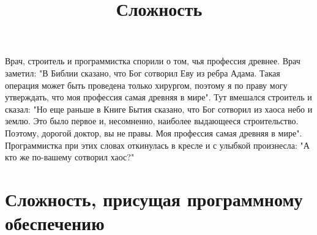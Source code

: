 \documentclass[11pt]{article}
\author{}
\date{}
\begin{document}
\title{\bf Сложность}
\maketitle
\thispagestyle{empty}
Врач, строитель и программистка спорили о том, чья профессия древнее. Врач заметил: "В Библии сказано, что Бог сотворил Еву из ребра Адама. Такая операция может быть проведена только хирургом, поэтому я по праву могу утверждать, что моя профессия самая древняя в мире". Тут вмешался строитель и сказал: "Но еще раньше в Книге Бытия сказано, что Бог сотворил из хаоса небо и землю. Это было первое и, несомненно, наиболее выдающееся строительство. Поэтому, дорогой доктор, вы не правы. Моя профессия самая древняя в мире". Программистка при этих словах откинулась в кресле и с улыбкой произнесла: "А кто же по-вашему сотворил хаос?"
\section{Сложность, присущая программному обеспечению}
\end{document}
